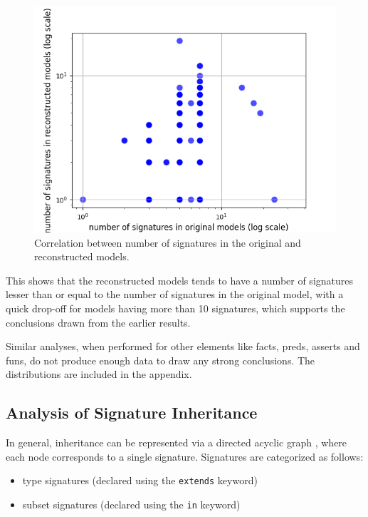 \documentclass[conference]{IEEEtran}
\begin{document}
    \begin{figure}[htbp]
        \centerline{\includegraphics[width=\linewidth]{"./Correlation between number of signatures in the original and reconstructed models.png"}}
        \caption{Correlation between number of signatures in the original and reconstructed models.}
        \label{fig}
        \end{figure}

        This shows that the reconstructed models tends to have a number of signatures lesser than or equal to the number of signatures in the original model, with a quick drop-off for models having more than 10 signatures, which supports the conclusions drawn from the earlier results.

        Similar analyses, when performed for other elements like facts, preds, asserts and funs, do not produce enough data to draw any strong conclusions. The distributions are included in the appendix.

\subsection{Analysis of Signature Inheritance}

In general, inheritance can be represented via a directed acyclic graph \cite{jackson-reference}, where each node corresponds to a single signature. Signatures are categorized as follows:

\begin{itemize}
    \item type signatures (declared using the \verb|extends| keyword)
    \item subset signatures (declared using the \verb|in| keyword)
\end{itemize}
\end{document}
